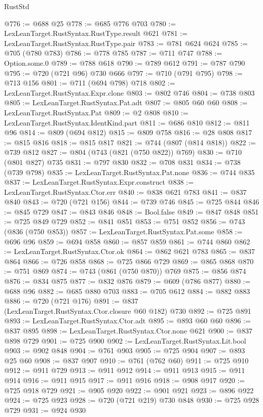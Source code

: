 \begin{lexlean}{RustStd}
\begin{coremodule}
@776 := @688 @25
@778 := @685 @776 @703
@780 := LexLeanTarget.RustSyntax.RustType.result @621
@781 := LexLeanTarget.RustSyntax.RustType.pair
@783 := @781 @624 @624
@785 := @705 (@780 @783)
@786 := @778 @785
@787 := @711 @747
@788 := Option.some.{0}
@789 := @788 @618
@790 := @789 @612
@791 := @787 @790
@795 := @720 (@721 @96) @730 @666
@797 := @710 (@791 @795)
@798 := @713 @156
@801 := @711 (@694 @798) @718
@802 := LexLeanTarget.RustSyntax.Expr.clone
@803 := @802 @746
@804 := @738 @803
@805 := LexLeanTarget.RustSyntax.Pat.adt
@807 := @805 @60 @60
@808 := LexLeanTarget.RustSyntax.Pat
@809 := @2 @808
@810 := LexLeanTarget.RustSyntax.IdentKind.part
@811 := @686 @810
@812 := @811 @96
@814 := @809 (@694 @812)
@815 := @809 @758
@816 := @28 @808
@817 := @815 @816
@818 := @815 @817
@821 := @744 (@807 (@814 @818))
@822 := @739 @812
@827 := @804 (@743 (@821 (@750 @822)) @769)
@830 := @710 (@801 @827) @735
@831 := @797 @830
@832 := @708 @831
@834 := @738 (@739 @798)
@835 := LexLeanTarget.RustSyntax.Pat.none
@836 := @744 @835
@837 := LexLeanTarget.RustSyntax.Expr.construct
@838 := LexLeanTarget.RustSyntax.Ctor.err
@840 := @838 @621 @783
@841 := @837 @840
@843 := @720 (@721 @156)
@844 := @739 @746
@845 := @725 @844
@846 := @845 @729
@847 := @843 @846
@848 := Bool.false
@849 := @847 @848
@851 := @725 @849 @729
@852 := @841 @851
@853 := @751 @852
@856 := @743 (@836 (@750 @853))
@857 := LexLeanTarget.RustSyntax.Pat.some
@858 := @696 @96
@859 := @694 @858
@860 := @857 @859
@861 := @744 @860
@862 := LexLeanTarget.RustSyntax.Ctor.ok
@864 := @862 @621 @783
@865 := @837 @864
@866 := @726 @858
@868 := @725 @866 @729
@869 := @865 @868
@870 := @751 @869
@874 := @743 (@861 (@750 @870)) @769
@875 := @856 @874
@876 := @834 @875
@877 := @832 @876
@879 := @609 (@786 @877)
@880 := @688 @96
@882 := @685 @880 @703
@883 := @705 @612
@884 := @882 @883
@886 := @720 (@721 @176)
@891 := @837 (LexLeanTarget.RustSyntax.Ctor.closure @60 @182) @730
@892 := @725 @891
@893 := LexLeanTarget.RustSyntax.Ctor.adt
@895 := @893 @60 @60
@896 := @837 @895
@898 := LexLeanTarget.RustSyntax.Ctor.none @621
@900 := @837 @898 @729
@901 := @725 @900
@902 := LexLeanTarget.RustSyntax.Lit.bool
@903 := @902 @848
@904 := @761 @903
@905 := @725 @904
@907 := @893 @25 @60
@908 := @837 @907
@910 := @761 (@762 @60)
@911 := @725 @910
@912 := @911 @729
@913 := @911 @912
@914 := @911 @913
@915 := @911 @914
@916 := @911 @915
@917 := @911 @916
@918 := @908 @917
@920 := @725 @918 @729
@921 := @905 @920
@922 := @901 @921
@923 := @896 @922
@924 := @725 @923
@928 := @720 (@721 @219) @730 @848
@930 := @725 @928 @729
@931 := @924 @930

\end{coremodule}
\end{lexlean}
